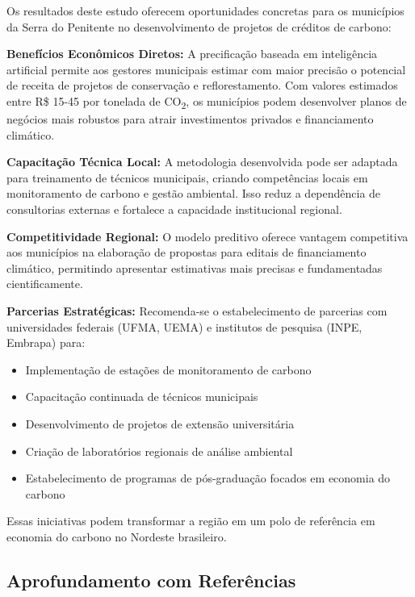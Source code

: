 \documentclass[conference]{IEEEtran}
\begin{document}
Os resultados deste estudo oferecem oportunidades concretas para os municípios da Serra do Penitente no desenvolvimento de projetos de créditos de carbono:

\textbf{Benefícios Econômicos Diretos:} A precificação baseada em inteligência artificial permite aos gestores municipais estimar com maior precisão o potencial de receita de projetos de conservação e reflorestamento. Com valores estimados entre R\$ 15-45 por tonelada de CO\textsubscript{2}, os municípios podem desenvolver planos de negócios mais robustos para atrair investimentos privados e financiamento climático.

\textbf{Capacitação Técnica Local:} A metodologia desenvolvida pode ser adaptada para treinamento de técnicos municipais, criando competências locais em monitoramento de carbono e gestão ambiental. Isso reduz a dependência de consultorias externas e fortalece a capacidade institucional regional.

\textbf{Competitividade Regional:} O modelo preditivo oferece vantagem competitiva aos municípios na elaboração de propostas para editais de financiamento climático, permitindo apresentar estimativas mais precisas e fundamentadas cientificamente.

\textbf{Parcerias Estratégicas:} Recomenda-se o estabelecimento de parcerias com universidades federais (UFMA, UEMA) e institutos de pesquisa (INPE, Embrapa) para:
\begin{itemize}
  \item Implementação de estações de monitoramento de carbono
  \item Capacitação continuada de técnicos municipais
  \item Desenvolvimento de projetos de extensão universitária
  \item Criação de laboratórios regionais de análise ambiental
  \item Estabelecimento de programas de pós-graduação focados em economia do carbono
\end{itemize}

Essas iniciativas podem transformar a região em um polo de referência em economia do carbono no Nordeste brasileiro.

\subsection{Aprofundamento com Referências}
\end{document}
